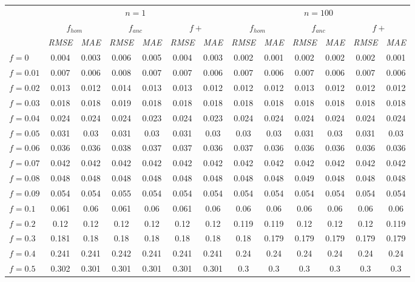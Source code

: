 \begin{tabular}{@{}lcccccccccccc@{}}
\toprule
 & \multicolumn{6}{c}{$n=1$} & \multicolumn{6}{c}{$n=100$} \\
\cmidrule(lr){2-7} \cmidrule(lr){8-13}
 & \multicolumn{2}{c}{$f_{hom}$} & \multicolumn{2}{c}{$f_{anc}$} & \multicolumn{2}{c}{$f+$} & \multicolumn{2}{c}{$f_{hom}$} & \multicolumn{2}{c}{$f_{anc}$} & \multicolumn{2}{c}{$f+$} \\
\cmidrule(lr){2-3} \cmidrule(lr){4-5} \cmidrule(lr){6-7} \cmidrule(lr){8-9} \cmidrule(lr){10-11} \cmidrule(lr){12-13}
 & \textit{RMSE} & \textit{MAE} & \textit{RMSE} & \textit{MAE} & \textit{RMSE} & \textit{MAE} & \textit{RMSE} & \textit{MAE} & \textit{RMSE} & \textit{MAE} & \textit{RMSE} & \textit{MAE} \\
\midrule
$f = 0$ & 0.004 & 0.003 & 0.006 & 0.005 & 0.004 & 0.003 & 0.002 & 0.001 & 0.002 & 0.002 & 0.002 & 0.001 \\
$f = 0.01$ & 0.007 & 0.006 & 0.008 & 0.007 & 0.007 & 0.006 & 0.007 & 0.006 & 0.007 & 0.006 & 0.007 & 0.006 \\
$f = 0.02$ & 0.013 & 0.012 & 0.014 & 0.013 & 0.013 & 0.012 & 0.012 & 0.012 & 0.013 & 0.012 & 0.012 & 0.012 \\
$f = 0.03$ & 0.018 & 0.018 & 0.019 & 0.018 & 0.018 & 0.018 & 0.018 & 0.018 & 0.018 & 0.018 & 0.018 & 0.018 \\
$f = 0.04$ & 0.024 & 0.024 & 0.024 & 0.023 & 0.024 & 0.023 & 0.024 & 0.024 & 0.024 & 0.024 & 0.024 & 0.024 \\
$f = 0.05$ & 0.031 & 0.03 & 0.031 & 0.03 & 0.031 & 0.03 & 0.03 & 0.03 & 0.031 & 0.03 & 0.031 & 0.03 \\
$f = 0.06$ & 0.036 & 0.036 & 0.038 & 0.037 & 0.037 & 0.036 & 0.037 & 0.036 & 0.036 & 0.036 & 0.036 & 0.036 \\
$f = 0.07$ & 0.042 & 0.042 & 0.042 & 0.042 & 0.042 & 0.042 & 0.042 & 0.042 & 0.042 & 0.042 & 0.042 & 0.042 \\
$f = 0.08$ & 0.048 & 0.048 & 0.048 & 0.048 & 0.048 & 0.048 & 0.048 & 0.048 & 0.049 & 0.048 & 0.048 & 0.048 \\
$f = 0.09$ & 0.054 & 0.054 & 0.055 & 0.054 & 0.054 & 0.054 & 0.054 & 0.054 & 0.054 & 0.054 & 0.054 & 0.054 \\
$f = 0.1$ & 0.061 & 0.06 & 0.061 & 0.06 & 0.061 & 0.06 & 0.06 & 0.06 & 0.06 & 0.06 & 0.06 & 0.06 \\
$f = 0.2$ & 0.12 & 0.12 & 0.12 & 0.12 & 0.12 & 0.12 & 0.119 & 0.119 & 0.12 & 0.12 & 0.12 & 0.119 \\
$f = 0.3$ & 0.181 & 0.18 & 0.18 & 0.18 & 0.18 & 0.18 & 0.18 & 0.179 & 0.179 & 0.179 & 0.179 & 0.179 \\
$f = 0.4$ & 0.241 & 0.241 & 0.242 & 0.241 & 0.241 & 0.241 & 0.24 & 0.24 & 0.24 & 0.24 & 0.24 & 0.24 \\
$f = 0.5$ & 0.302 & 0.301 & 0.301 & 0.301 & 0.301 & 0.301 & 0.3 & 0.3 & 0.3 & 0.3 & 0.3 & 0.3 \\
\bottomrule
\end{tabular}
